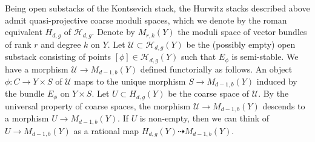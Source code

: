 \documentclass[11 pt]{amsart}
\providecommand {\from}{{\colon}}
\numberwithin{equation}{section}
\begin{document}
Being open substacks of the Kontsevich stack, the Hurwitz stacks described above admit quasi-projective coarse moduli spaces, which we denote by the roman equivalent $H_{d,g}$ of $\mathcal H_{d,g}$.
Denote by $M_{r,k}(Y)$ the moduli space of vector bundles of rank $r$ and degree $k$ on $Y$.
Let $\mathcal U \subset \mathcal H_{d,g}(Y)$ be the (possibly empty) open substack consisting of points $[\phi] \in \mathcal H_{d,g}(Y)$ such that $E_\phi$ is semi-stable.
We have a morphism $\mathcal U \to M_{d-1,b}(Y)$ defined functorially as follows.
An object $\phi \from C \to Y \times S$ of $\mathcal U$ maps to the unique morphism $S \to M_{d-1,b}(Y)$ induced by the bundle $E_\phi$ on $Y \times S$.
Let $U \subset H_{d,g}(Y)$ be the coarse space of $\mathcal U$.
By the universal property of coarse spaces, the morphism $\mathcal U \to M_{d-1,b}(Y)$ descends to a morphism $U \to M_{d-1,b}(Y)$.
If $U$ is non-empty, then we can think of $U \to M_{d-1,b}(Y)$ as a rational map $H_{d,g}(Y) \dashrightarrow M_{d-1,b}(Y)$.
\end{document}
